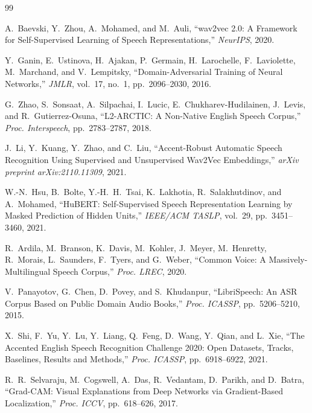 \documentclass[10pt,twocolumn,letterpaper]{article}
\begin{document}
{\small

\begin{thebibliography}{99}

A.~Baevski, Y.~Zhou, A.~Mohamed, and M.~Auli,
``wav2vec 2.0: A Framework for Self-Supervised Learning of Speech Representations,''
\textit{NeurIPS}, 2020.

Y.~Ganin, E.~Ustinova, H.~Ajakan, P.~Germain, H.~Larochelle, F.~Laviolette, M.~Marchand, and V.~Lempitsky,
``Domain-Adversarial Training of Neural Networks,''
\textit{JMLR}, vol.~17, no.~1, pp.~2096--2030, 2016.

G.~Zhao, S.~Sonsaat, A.~Silpachai, I.~Lucic, E.~Chukharev-Hudilainen, J.~Levis, and R.~Gutierrez-Osuna,
``L2-ARCTIC: A Non-Native English Speech Corpus,''
\textit{Proc. Interspeech}, pp.~2783--2787, 2018.

J.~Li, Y.~Kuang, Y.~Zhao, and C.~Liu,
``Accent-Robust Automatic Speech Recognition Using Supervised and Unsupervised Wav2Vec Embeddings,''
\textit{arXiv preprint arXiv:2110.11309}, 2021.

W.-N.~Hsu, B.~Bolte, Y.-H.~H.~Tsai, K.~Lakhotia, R.~Salakhutdinov, and A.~Mohamed,
``HuBERT: Self-Supervised Speech Representation Learning by Masked Prediction of Hidden Units,''
\textit{IEEE/ACM TASLP}, vol.~29, pp.~3451--3460, 2021.

R.~Ardila, M.~Branson, K.~Davis, M.~Kohler, J.~Meyer, M.~Henretty, R.~Morais, L.~Saunders, F.~Tyers, and G.~Weber,
``Common Voice: A Massively-Multilingual Speech Corpus,''
\textit{Proc. LREC}, 2020.

V.~Panayotov, G.~Chen, D.~Povey, and S.~Khudanpur,
``LibriSpeech: An ASR Corpus Based on Public Domain Audio Books,''
\textit{Proc. ICASSP}, pp.~5206--5210, 2015.

X.~Shi, F.~Yu, Y.~Lu, Y.~Liang, Q.~Feng, D.~Wang, Y.~Qian, and L.~Xie,
``The Accented English Speech Recognition Challenge 2020: Open Datasets, Tracks, Baselines, Results and Methods,''
\textit{Proc. ICASSP}, pp.~6918--6922, 2021.

R.~R.~Selvaraju, M.~Cogswell, A.~Das, R.~Vedantam, D.~Parikh, and D.~Batra,
``Grad-CAM: Visual Explanations from Deep Networks via Gradient-Based Localization,''
\textit{Proc. ICCV}, pp.~618--626, 2017.


\end{thebibliography}}
\end{document}
